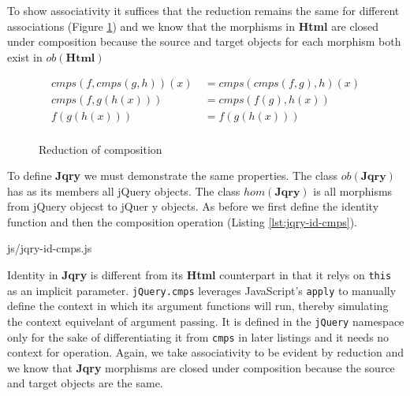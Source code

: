 \documentclass[preprint, leqno]{sigplanconf}
\begin{document}
To show associativity it suffices that the reduction remains the same for different associations (Figure \ref{fig:html-associativity}) and we know that the morphisms in \textbf{Html} are closed under composition because the source and target objects for each morphism both exist in \begin{math}ob(\mathbf{Html})\end{math}

\begin{figure}
\begin{displaymath}
\begin{aligned}
cmps(f,cmps(g,h))(x)\ &= cmps(cmps(f,g),h)(x) \\
cmps(f,g(h(x)))\ &= cmps(f(g),h(x)) \\
f(g(h(x)))\ &= f(g(h(x)))\\
\end{aligned}
\end{displaymath}
\nocaptionrule \caption{Reduction of composition}
\label{fig:html-associativity}
\end{figure}

To define \textbf{Jqry} we must demonstrate the same properties. The class \begin{math}ob(\mathbf{Jqry})\end{math} has as its members all jQuery objects. The class \begin{math}hom(\mathbf{Jqry})\end{math} is all morphisms from jQuery objecst to jQuer y objects. As before we first define the identity function and then the composition operation (Listing \ref{lst:jqry-id-cmps}).

\begin{bottom}
\begin{lstinputlisting}[
    language=JavaScript,
    caption={Identity and Composition in Jqry},
    label={lst:jqry-id-cmps},
    escapeinside={@}{@}
]{js/jqry-id-cmps.js}
\end{lstinputlisting}
\end{bottom}

Identity in \textbf{Jqry} is different from its \textbf{Html} counterpart in that it relys on \verb|this| as an implicit parameter. \verb|jQuery.cmps| leverages JavaScript's \verb|apply| to manually define the context in which its argument functions will run, thereby simulating the context equivelant of argument passing. It is defined in the \verb|jQuery| namespace only for the sake of differentiating it from \verb|cmps| in later listings and it needs no context for operation. Again, we take associativity to be evident by reduction and we know that \textbf{Jqry} morphisms are closed under composition because the source and target objects are the same.
\end{document}
